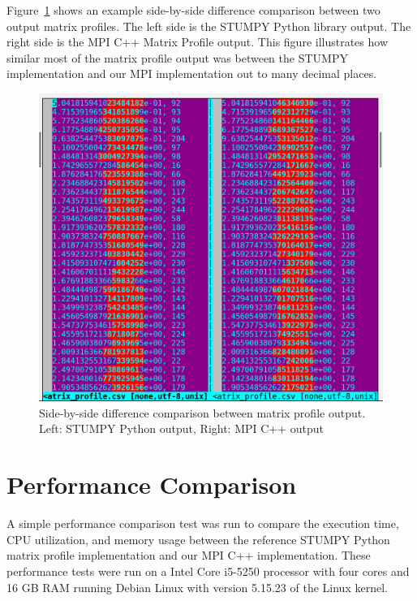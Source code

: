 \documentclass[conference]{IEEEtran}
\begin{document}
Figure~\ref{fig:Matrix_Profile_Diff} shows an example side-by-side difference comparison between two output matrix profiles.  The left side is the STUMPY Python library output.  The right side is the MPI C++ Matrix Profile output.  This figure illustrates how similar most of the matrix profile output was between the STUMPY implementation and our MPI implementation out to many decimal places.

\begin{figure}
\begin{center}
\includegraphics[scale=0.42]{matrix_profile_diff.png}
\caption{Side-by-side difference comparison between matrix profile output.   Left: STUMPY Python output, Right: MPI C++ output}
\label{fig:Matrix_Profile_Diff}
\end{center}
\end{figure}

\section{Performance Comparison}
A simple performance comparison test was run to compare the execution time, CPU utilization, and memory usage between the reference STUMPY Python matrix profile implementation and our MPI C++ implementation.  These performance tests were run on a Intel Core i5-5250 processor with four cores and 16 GB RAM running Debian Linux with version 5.15.23 of the Linux kernel.  
\end{document}
